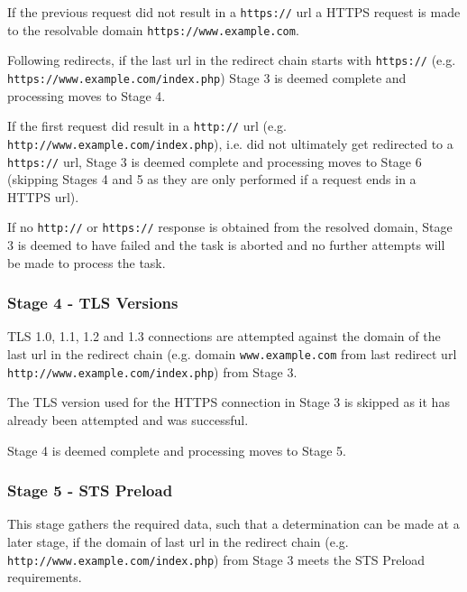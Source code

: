 \documentclass{mscreport}
\begin{document}
\vspace{0.3cm} \noindent
If the previous request did not result in a \texttt{https://} url a HTTPS request is made to the resolvable domain \texttt{https://www.example.com}.

\vspace{0.3cm} \noindent
Following redirects, if the last url in the redirect chain starts with \texttt{https://} (e.g. \newline \texttt{https://www.example.com/index.php}) Stage 3 is deemed complete and processing moves to Stage 4.

\vspace{0.3cm} \noindent
If the first request did result in a \texttt{http://} url (e.g. \texttt{http://www.example.com/index.php}), i.e. did not ultimately get redirected to a \texttt{https://} url, Stage 3 is deemed complete and processing moves to Stage 6 (skipping Stages 4 and 5 as they are only performed if a request ends in a HTTPS url).

\vspace{0.3cm} \noindent
If no \texttt{http://} or \texttt{https://} response is obtained from the resolved domain, Stage 3 is deemed to have failed and the task is aborted and no further attempts will be made to process the task.

\subsubsection{Stage 4 - TLS Versions}

TLS 1.0, 1.1, 1.2 and 1.3 connections are attempted against the domain of the last url in the redirect chain (e.g. domain \texttt{www.example.com} from last redirect url \newline \texttt{http://www.example.com/index.php}) from Stage 3.

\vspace{0.3cm} \noindent
The TLS version used for the HTTPS connection in Stage 3 is skipped as it has already been attempted and was successful.


\vspace{0.3cm} \noindent
Stage 4 is deemed complete and processing moves to Stage 5.

\subsubsection{Stage 5 - STS Preload}
\label{subsection:stage_5_STS}

This stage gathers the required data, such that a determination can be made at a later stage, if the domain of last url in the redirect chain (e.g. \texttt{http://www.example.com/index.php}) from Stage 3 meets the STS Preload requirements.
\end{document}
